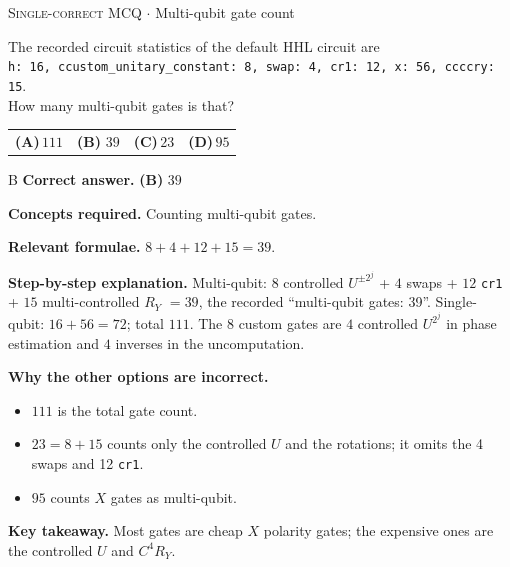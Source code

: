 \documentclass[11pt,a4paper]{article}
\newcommand{\optlabel}[1]{\textbf{(#1)}}
\newcommand{\correctlabel}[1]{\textcolor{okgreen}{\textbf{(#1)}\,\ding{51}}}
\newenvironment{qitem}[1]{\begin{list}{}{\setlength{\leftmargin}{3.3em}\setlength{\labelwidth}{3.1em}%
  \setlength{\labelsep}{0.2em}\setlength{\topsep}{3pt}\setlength{\parsep}{3pt}}\item[\textbf{Q.#1}\hfill]}{\end{list}}
\newcommand{\qsep}{\par\vspace{2pt}{\color{black!15}\hrule}\vspace{4pt}}
\newcommand{\qmeta}[2]{{\footnotesize\color{black!60}\textsc{#1} \;$\cdot$\; #2}\par}
\begin{document}
\begin{qitem}{57}
\qmeta{Single-correct MCQ}{Multi-qubit gate count}
The recorded circuit statistics of the default HHL circuit are\\
\hspace*{1em}\texttt{h: 16, ccustom\_unitary\_constant: 8, swap: 4, cr1: 12, x: 56, ccccry: 15}.\\
How many multi-qubit gates is that?
\par\smallskip\noindent\begin{tabularx}{\linewidth}{@{}*{4}{L}@{}}
\optlabel{A}\,$111$ & \correctlabel{B}\,$39$ & \optlabel{C}\,$23$ & \optlabel{D}\,$95$
\end{tabularx}
\end{qitem}
\begin{solbox}{B}
\textbf{\color{brand}Correct answer.} \textcolor{okgreen}{\textbf{(B)}} $39$

\textbf{\color{brand}Concepts required.} Counting multi-qubit gates.

\textbf{\color{brand}Relevant formulae.} $8 + 4 + 12 + 15 = 39$.

\textbf{\color{brand}Step-by-step explanation.} Multi-qubit: $8$ controlled $U^{\pm2^j}$ + $4$ swaps + $12$ \texttt{cr1} + $15$ multi-controlled $R_Y$ $= 39$, the recorded ``multi-qubit gates: 39''. Single-qubit: $16 + 56 = 72$; total $111$.
The $8$ custom gates are $4$ controlled $U^{2^j}$ in phase estimation and $4$ inverses in the uncomputation.

\textbf{\color{brand}Why the other options are incorrect.}
\begin{itemize}[leftmargin=2.4em, itemsep=1pt, topsep=2pt]
\item[\textbf{(A)}] $111$ is the total gate count.
\item[\textbf{(C)}] $23 = 8 + 15$ counts only the controlled $U$ and the rotations; it omits the 4 swaps and 12 \texttt{cr1}.
\item[\textbf{(D)}] $95$ counts $X$ gates as multi-qubit.
\end{itemize}
\textbf{\color{brand}Key takeaway.} Most gates are cheap $X$ polarity gates; the expensive ones are the controlled $U$ and $C^4R_Y$.
\end{solbox}
\qsep
\end{document}
